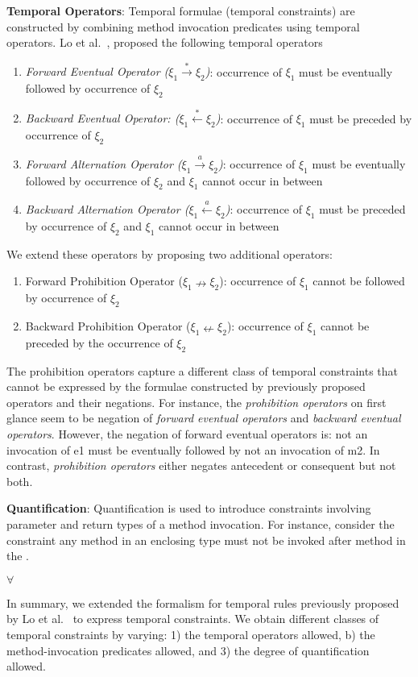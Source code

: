 \textbf{Temporal Operators}: Temporal formulae (temporal constraints) are constructed by combining method invocation predicates using temporal operators. Lo et al.~\cite{lo2009mining}, proposed the following temporal operators    

\begin{enumerate}

\item \textit{Forward Eventual Operator ($\xi_1 \xrightarrow{*} \xi_2$)}:
occurrence of $\xi_1$ must be eventually followed by occurrence of $\xi_2$

\item \textit{Backward Eventual Operator: ($\xi_1 \xleftarrow{*} \xi_2$)}:
occurrence of $\xi_1$ must be preceded by occurrence of $\xi_2$

\item \textit{Forward Alternation Operator ($\xi_1 \xrightarrow{a} \xi_2$)}:
occurrence of $\xi_1$ must be eventually followed by occurrence of $\xi_2$ and $\xi_1$ cannot occur in between

\item \textit{Backward Alternation Operator ($\xi_1 \xleftarrow{a} \xi_2$)}:
occurrence of $\xi_1$ must be preceded by occurrence of $\xi_2$ and $\xi_1$ cannot occur in between
\end{enumerate}

We extend these operators by proposing two additional operators:
\begin{enumerate}
\item Forward Prohibition Operator ($\xi_1 \nrightarrow \xi_2$):
occurrence of $\xi_1$ cannot be followed by occurrence of $\xi_2$

\item Backward Prohibition Operator ($\xi_1 \nleftarrow \xi_2$):
occurrence of $\xi_1$ cannot be preceded by the occurrence of $\xi_2$
\end{enumerate}

The prohibition operators capture a different class of temporal constraints that cannot be expressed by the formulae constructed by previously proposed operators and their negations. For instance, the \textit{prohibition operators} on first glance seem to be negation of \textit{forward eventual operators} and \textit{backward eventual operators}. However, the negation of forward eventual operators is: not an invocation of e1 must be eventually followed by not an invocation of m2. In contrast, \textit{prohibition operators} either negates antecedent or consequent but not both.  

\textbf{Quantification}: Quantification is used to introduce constraints involving parameter and return types of a method invocation. For instance, consider the constraint any method in an enclosing type  must not be invoked after method  in the .

$\forall$ 

In summary, we extended the formalism for temporal rules previously proposed by Lo et al.~\cite{lo2009mining} to express temporal constraints.
We obtain different classes of temporal constraints by varying: 1) the temporal operators allowed, b) the method-invocation predicates allowed, and 3) the degree of quantification allowed.